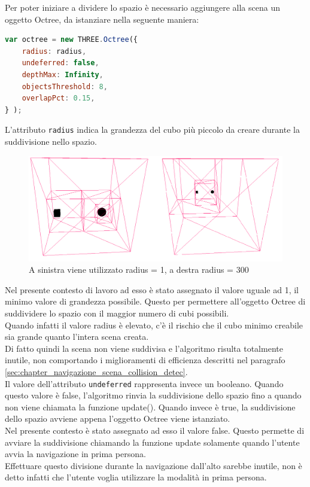 Per poter iniziare a dividere lo spazio è necessario aggiungere alla scena un oggetto Octree, da istanziare nella seguente maniera: \cite{octree_git}
\begin{lstlisting}[language=javascript]
var octree = new THREE.Octree({
    radius: radius, 
    undeferred: false,
    depthMax: Infinity,
    objectsThreshold: 8,
    overlapPct: 0.15,
} );
\end{lstlisting}
L'attributo \texttt{radius} indica la grandezza del cubo più piccolo da creare durante la suddivisione nello spazio.
\begin{figure}[htb]
 \centering
 \includegraphics[width=1\linewidth]{images/chapter_navigazione_scena/boxradius.png}\hfill
 \caption[Octree radius.]{A sinistra viene utilizzato radius = 1, a destra radius = 300}
 \label{fig:navigazione_scena_collision_boxradius}
\end{figure}
Nel presente contesto di lavoro ad esso è stato assegnato il valore uguale ad 1, il minimo valore di grandezza possibile. 
Questo per permettere all’oggetto Octree di suddividere lo spazio con il maggior numero di cubi possibili.
\\
Quando infatti il valore radius è elevato, c’è il rischio che il cubo minimo creabile sia grande quanto l’intera scena creata.
\\ 
Di fatto quindi la scena non viene suddivisa e l’algoritmo risulta totalmente inutile, non comportando i miglioramenti di efficienza descritti nel paragrafo \ref{sec:chapter_navigazione_scena_collision_detec}.
\\

Il valore dell’attributo \texttt{undeferred} rappresenta invece un booleano. 
Quando questo valore è false, l’algoritmo rinvia la suddivisione dello spazio fino a quando non viene chiamata la funzione update(). Quando invece è true, la suddivisione dello spazio avviene appena l’oggetto Octree viene istanziato.
\\
Nel presente contesto è stato assegnato ad esso il valore false. Questo permette di avviare la suddivisione chiamando la funzione update solamente quando l’utente avvia la navigazione in prima persona.
\\
Effettuare questo divisione durante la navigazione dall’alto sarebbe inutile, non è detto infatti che l’utente voglia utilizzare la modalità in prima persona.
\\

